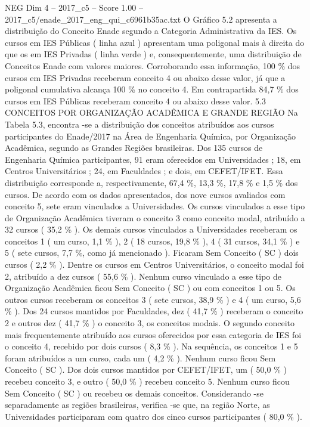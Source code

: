 \begin{textsample}{NEG Dim 4 – 2017\_c5 – Score 1.00 – 2017\_c5/enade\_2017\_eng\_qui\_c6961b35ac.txt}
O Gráfico 5.2 apresenta a distribuição do Conceito Enade segundo a Categoria Administrativa da IES.
Os cursos em IES Públicas ( linha azul ) apresentam uma poligonal mais à direita do que os em IES Privadas ( linha verde ) e, consequentemente, uma distribuição de Conceitos Enade com valores maiores.
Corroborando essa informação, 100 \% dos cursos em IES Privadas receberam conceito 4 ou abaixo desse valor, já que a poligonal cumulativa alcança 100 \% no conceito 4.
Em contrapartida 84,7 \% dos cursos em IES Públicas receberam conceito 4 ou abaixo desse valor. 5.3 CONCEITOS POR ORGANIZAÇÃO ACADÊMICA E GRANDE REGIÃO Na Tabela 5.3, encontra -se a distribuição dos conceitos atribuídos aos cursos participantes do Enade/2017 na Área de Engenharia Química, por Organização Acadêmica, segundo as Grandes Regiões brasileiras.
Dos 135 cursos de Engenharia Química participantes, 91 eram oferecidos em Universidades ; 18, em Centros Universitários ; 24, em Faculdades ; e dois, em CEFET/IFET.
Essa distribuição corresponde a, respectivamente, 67,4 \%, 13,3 \%, 17,8 \% e 1,5 \% dos cursos.
De acordo com os dados apresentados, dos nove cursos avaliados com conceito 5, sete eram vinculados a Universidades.
Os cursos vinculados a esse tipo de Organização Acadêmica tiveram o conceito 3 como conceito modal, atribuído a 32 cursos ( 35,2 \% ).
Os demais cursos vinculados a Universidades receberam os conceitos 1 ( um curso, 1,1 \% ), 2 ( 18 cursos, 19,8 \% ), 4 ( 31 cursos, 34,1 \% ) e 5 ( sete cursos, 7,7 \%, como já mencionado ).
Ficaram Sem Conceito ( SC ) dois cursos ( 2,2 \% ).
Dentre os cursos em Centros Universitários, o conceito modal foi 2, atribuído a dez cursos ( 55,6 \% ).
Nenhum curso vinculado a esse tipo de Organização Acadêmica ficou Sem Conceito ( SC ) ou com conceitos 1 ou 5.
Os outros cursos receberam os conceitos 3 ( sete cursos, 38,9 \% ) e 4 ( um curso, 5,6 \% ).
Dos 24 cursos mantidos por Faculdades, dez ( 41,7 \% ) receberam o conceito 2 e outros dez ( 41,7 \% ) o conceito 3, os conceitos modais.
O segundo conceito mais frequentemente atribuído aos cursos oferecidos por essa categoria de IES foi o conceito 4, recebido por dois cursos ( 8,3 \% ).
Na sequência, os conceitos 1 e 5 foram atribuídos a um curso, cada um ( 4,2 \% ).
Nenhum curso ficou Sem Conceito ( SC ).
Dos dois cursos mantidos por CEFET/IFET, um ( 50,0 \% ) recebeu conceito 3, e outro ( 50,0 \% ) recebeu conceito 5.
Nenhum curso ficou Sem Conceito ( SC ) ou recebeu os demais conceitos.
Considerando -se separadamente as regiões brasileiras, verifica -se que, na região Norte, as Universidades participaram com quatro dos cinco cursos participantes ( 80,0 \% ).

\end{textsample}
